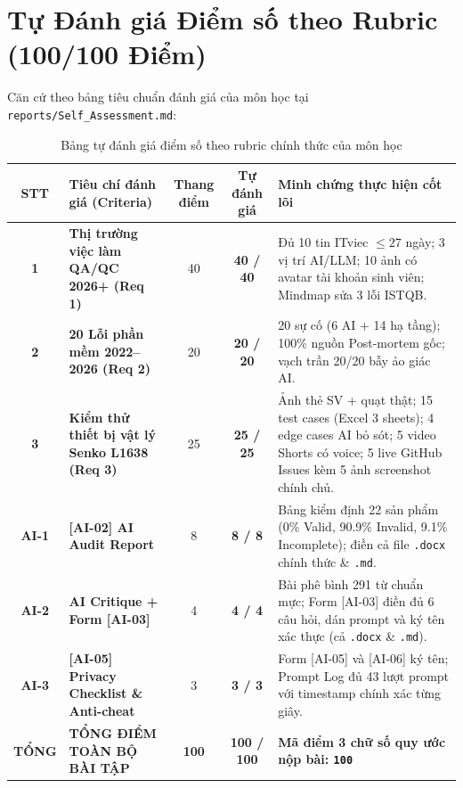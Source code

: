 \documentclass[11pt,a4paper]{article}
\newcommand{\filepath}[1]{\nolinkurl{#1}}
\begin{document}
\section{Tự Đánh giá Điểm số theo Rubric (100/100 Điểm)}

Căn cứ theo bảng tiêu chuẩn đánh giá của môn học tại \filepath{reports/Self_Assessment.md}:

\begin{table}[htbp]
\centering
\small
\begin{tabularx}{\textwidth}{@{} c p{4.2cm} c c X @{}}
\toprule
\textbf{STT} & \textbf{Tiêu chí đánh giá (Criteria)} & \textbf{Thang điểm} & \textbf{Tự đánh giá} & \textbf{Minh chứng thực hiện cốt lõi} \\
\midrule
\textbf{1} & \textbf{Thị trường việc làm QA/QC 2026+ (Req 1)} & 40 & \textbf{40 / 40} & Đủ 10 tin ITviec $\le 27$ ngày; 3 vị trí AI/LLM; 10 ảnh có avatar tài khoản sinh viên; Mindmap sửa 3 lỗi ISTQB. \\
\textbf{2} & \textbf{20 Lỗi phần mềm 2022–2026 (Req 2)} & 20 & \textbf{20 / 20} & 20 sự cố (6 AI + 14 hạ tầng); 100\% nguồn Post-mortem gốc; vạch trần 20/20 bẫy ảo giác AI. \\
\textbf{3} & \textbf{Kiểm thử thiết bị vật lý Senko L1638 (Req 3)} & 25 & \textbf{25 / 25} & Ảnh thẻ SV + quạt thật; 15 test cases (Excel 3 sheets); 4 edge cases AI bỏ sót; 5 video Shorts có voice; 5 live GitHub Issues kèm 5 ảnh screenshot chính chủ. \\
\textbf{AI-1} & \textbf{[AI-02] AI Audit Report} & 8 & \textbf{8 / 8} & Bảng kiểm định 22 sản phẩm (0\% Valid, 90.9\% Invalid, 9.1\% Incomplete); điền cả file \texttt{.docx} chính thức \& \texttt{.md}. \\
\textbf{AI-2} & \textbf{AI Critique + Form [AI-03]} & 4 & \textbf{4 / 4} & Bài phê bình 291 từ chuẩn mực; Form [AI-03] điền đủ 6 câu hỏi, dán prompt và ký tên xác thực (cả \texttt{.docx} \& \texttt{.md}). \\
\textbf{AI-3} & \textbf{[AI-05] Privacy Checklist \& Anti-cheat} & 3 & \textbf{3 / 3} & Form [AI-05] và [AI-06] ký tên; Prompt Log đủ 43 lượt prompt với timestamp chính xác từng giây. \\
\midrule
\textbf{TỔNG} & \textbf{TỔNG ĐIỂM TOÀN BỘ BÀI TẬP} & \textbf{100} & \textbf{100 / 100} & \textbf{Mã điểm 3 chữ số quy ước nộp bài: \texttt{100}} \\
\bottomrule
\end{tabularx}
\caption{Bảng tự đánh giá điểm số theo rubric chính thức của môn học}
\end{table}
\end{document}
